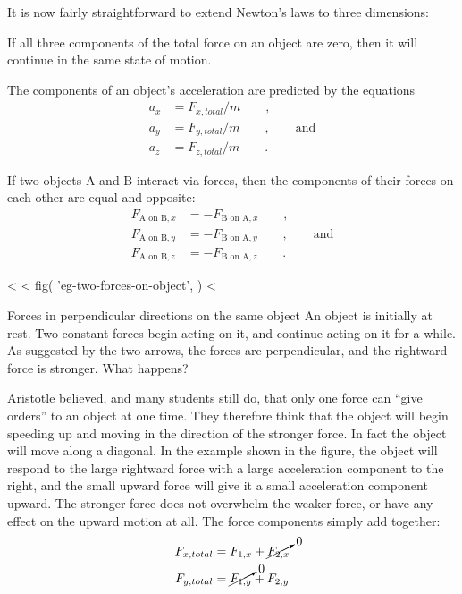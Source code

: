 It is now fairly straightforward to extend Newton's laws
to three dimensions:

\begin{lessimportant}
  If all three components of the total force on an object are
  zero, then it will continue in the same state of motion.
\end{lessimportant}

\begin{lessimportant}
The components of an object's acceleration are predicted by the equations
\begin{align*}
        a_x  &=  F_{x,total}/m  \qquad ,  \\
        a_y  &=  F_{y,total}/m  \qquad , \qquad \text{and}  \\
        a_z  &=  F_{z,total}/m   \qquad   .
\end{align*}
\end{lessimportant}

\begin{lessimportant}
If two objects A and B interact via forces, then the
components of their forces on each other are equal and opposite:
\begin{align*}
        F_{\text{A on B},x}  &=  -F_{\text{B on A},x}   \qquad   ,  \\
        F_{\text{A on B},y}  &=  -F_{\text{B on A},y}   \qquad   , \qquad \text{and}  \\
        F_{\text{A on B},z}  &=  -F_{\text{B on A},z}   \qquad   .
\end{align*}
\end{lessimportant}

<%
<%
  fig(
    'eg-two-forces-on-object',
  )
<%
\begin{eg}{Forces in perpendicular directions on the same object}\label{eg:two-forces-on-object}
\egquestion An object is initially at rest. Two constant
forces begin acting on it, and continue acting on it for a
while. As suggested by the two arrows, the forces are
perpendicular, and the rightward force is stronger. What happens?

\eganswer
 Aristotle believed, and many students still do, that
only one force can ``give orders'' to an object at one time.
They therefore think that the object will begin speeding up
and moving in the direction of the stronger force. In fact
the object will move along a diagonal. In the example shown
in the figure, the object will respond to the large
rightward force with a large acceleration component to the
right, and the small upward force will give it a small
acceleration component upward. The stronger force does not
overwhelm the weaker force, or have any effect on the upward
motion at all. The force components simply add together:
\begin{align*}
  F_{x,total} &= F_{1,x} + \cancelto{0}{F_{2,x}} \\
  F_{y,total} &= \cancelto{0}{F_{1,y}} + F_{2,y} 
\end{align*}
\end{eg}

